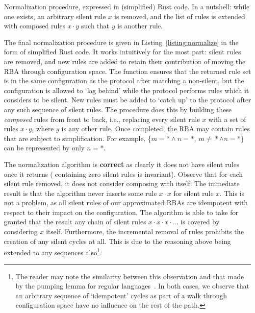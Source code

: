 \begin{listing}[ht]
	\inputminted[]{rust}{normalize.rs}
	\caption[Normalization procedure Rusty pseudocode.]{Normalization procedure, expressed in (simplified) Rust code. In a nutshell: while one exists, an arbitrary silent rule $x$ is removed, and the list of rules is extended with composed rules $x\cdot{}y$ such that $y$ is another rule.}
	\label{listing:normalize}
\end{listing}

The final normalization procedure is given in Listing~\ref{listing:normalize} in the form of simplified Rust code. It works intuitively for the most part: silent rules are removed, and new rules are added to retain their contribution of moving the RBA through configuration space. The function  ensures that the returned rule set is in the same configuration as the protocol after matching a non-silent, but the configuration is allowed to `lag behind' while the protocol performs rules which it considers to be silent. New rules must be added to `catch up' to the protocol after any such sequence of silent rules. The procedure does this by building these \textit{composed} rules from front to back, i.e., replacing every silent rule $x$ with a set of rules $x\cdot{}y$, where $y$ is any other rule. Once completed, the RBA may contain rules that are subject to simplification. For example, \{$m=*\wedge{}n=*$, $m\neq{}*\wedge{}n=*$\} can be represented by only $n=*$.

The normalization algorithm is \textbf{correct} as clearly it does not have silent rules once it returns ( containing zero silent rules is invariant). Observe that for each silent rule removed, it does not consider composing with itself. The immediate result is that the algorithm never inserts some rule $x\cdot{}x$ for silent rule $x$. This is not a problem, as all silent rules of our approximated RBAs are idempotent with respect to their impact on the configuration. The algorithm is able to take for granted that the result any chain of silent rules $x\cdot{}x\cdot{}x\cdot{}...$ is covered by considering $x$ itself. Furthermore, the incremental removal of rules prohibits the creation of any silent cycles at all. This is due to the reasoning above being extended to any sequences also\footnote{The reader may note the similarity between this observation and that made by the pumping lemma for regular languages~\cite{linz2006introduction}. In both cases, we observe that an arbitrary sequence of `idempotent' cycles as part of a walk through configuration space have no influence on the rest of the path.}. 


